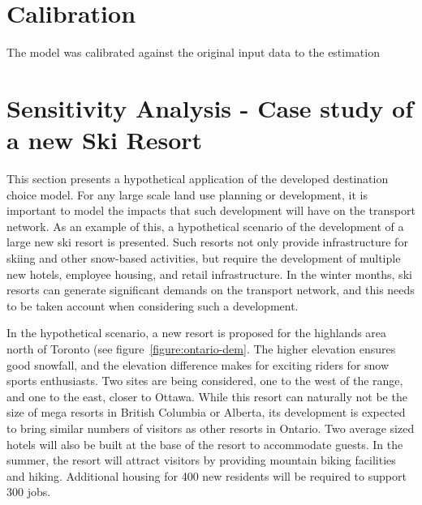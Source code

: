 \section{Calibration}


The model was calibrated against the original input data to the estimation


\section{Sensitivity Analysis - Case study of a new Ski Resort}




This section presents a hypothetical application of the developed destination choice model. For any large scale land use planning or development, it is important to model the impacts that such development will have on the transport network. As an example of this, a hypothetical scenario of the development of a large new ski resort is presented. Such resorts not only provide infrastructure for skiing and other snow-based activities, but require the development of multiple new hotels, employee housing, and retail infrastructure. In the winter months, ski resorts can generate significant demands on the transport network, and this needs to be taken account when considering such a development.

In the hypothetical scenario, a new resort is proposed for the highlands area north of Toronto (see figure~\ref{figure:ontario-dem}. The higher elevation ensures good snowfall, and the elevation difference makes for exciting riders for snow sports enthusiasts. Two sites are being considered, one to the west of the range, and one to the east, closer to Ottawa. While this resort can naturally not be the size of mega resorts in British Columbia or Alberta, its development is expected to bring similar numbers of visitors as other resorts in Ontario. Two average sized hotels will also be built at the base of the resort to accommodate guests. In the summer, the resort will attract visitors by providing mountain biking facilities and hiking. Additional housing for 400 new residents will be required to support 300 jobs.


